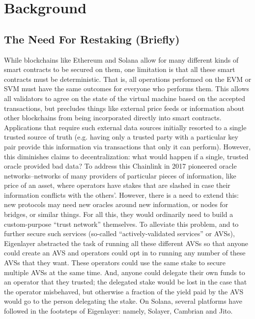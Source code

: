 \documentclass{article}
\begin{document}
\section{Background}
\subsection{The Need For Restaking (Briefly)}
While blockchains like Ethereum and Solana allow for many different kinds of smart contracts to be secured on them, one limitation is that all these smart contracts must be deterministic\cite{ethereum_deterministic}\cite{solana_oracles}. That is, all operations performed on the EVM or SVM must have the same outcomes for everyone who performs them. 
This allows all validators to agree on the state of the virtual machine based on the accepted transactions, but precludes things like external price feeds or information about other blockchains from being incorporated directly into smart contracts. 
Applications that require such external data sources initially resorted to a single trusted source of truth (e.g. having only a trusted party with a particular key pair provide this information via transactions that only it can perform). 
However, this diminishes claims to decentralization: what would happen if a single, trusted oracle provided bad data? To address this Chainlink in 2017 pioneered oracle networks--networks of many providers of particular pieces of information, like price of an asset, where operators have stakes that are slashed in case their information conflicts with the others'\cite{chainlink}.
However, there is a need to extend this: new protocols may need new oracles around new information, or nodes for bridges, or similar things. For all this, they would ordinarily need to build a custom-purpose ``trust network'' themselves.
To alleviate this problem, and to further secure such services (so-called ``actively-validated services'' or AVSs), Eigenlayer abstracted the task of running all these different AVSs so that anyone could create an AVS and operators could opt in to running any number of these AVSs that they want\cite{eigenlayer}. 
These operators could use the same stake to secure multiple AVSs at the same time. And, anyone could delegate their own funds to an operator that they trusted; the delegated stake would be lost in the case that the operator misbehaved, but otherwise a fraction of the yield paid by the AVS would go to the person delegating the stake.
On Solana, several platforms have followed in the footsteps of Eigenlayer: namely, Solayer\cite{solayer}, Cambrian\cite{cambrian} and Jito\cite{jito_restaking}.
\end{document}
